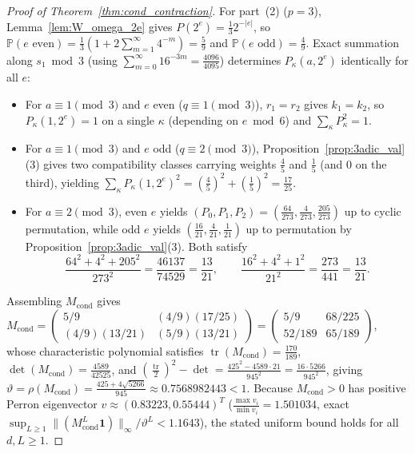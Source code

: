 \documentclass[11pt,a4paper]{article}
\numberwithin{equation}{section}
\theoremstyle{definition}
\theoremstyle{remark}
\renewcommand{\P}{\mathbb{P}}
\begin{document}
\begin{proof}[Proof of Theorem~\ref{thm:cond_contraction}]
For part~(2) ($p = 3$), Lemma~\ref{lem:W_omega_2e} gives $P(2^e) = \frac{1}{3} 2^{-|e|}$, so $\P(e \text{ even}) = \frac{1}{3}(1 + 2\sum_{m=1}^\infty 4^{-m}) = \frac{5}{9}$ and $\P(e \text{ odd}) = \frac{4}{9}$. Exact summation along $s_1 \bmod 3$ (using $\sum_{m=0}^\infty 16^{-3m} = \frac{4096}{4095}$) determines $P_\kappa(a, 2^e)$ identically for all $e$:
\begin{itemize}[leftmargin=2em]
\item For $a \equiv 1 \pmod 3$ and $e$ even ($q \equiv 1 \pmod 3$), $r_1 = r_2$ gives $k_1 = k_2$, so $P_\kappa(1, 2^e) = 1$ on a single $\kappa$ (depending on $e \bmod 6$) and $\sum_\kappa P_\kappa^2 = 1$.
\item For $a \equiv 1 \pmod 3$ and $e$ odd ($q \equiv 2 \pmod 3$), Proposition~\ref{prop:3adic_val}(3) gives two compatibility classes carrying weights $\frac{4}{5}$ and $\frac{1}{5}$ (and $0$ on the third), yielding $\sum_\kappa P_\kappa(1, 2^e)^2 = \left(\frac{4}{5}\right)^2 + \left(\frac{1}{5}\right)^2 = \frac{17}{25}$.
\item For $a \equiv 2 \pmod 3$, even $e$ yields $(P_0, P_1, P_2) = (\frac{64}{273}, \frac{4}{273}, \frac{205}{273})$ up to cyclic permutation, while odd $e$ yields $(\frac{16}{21}, \frac{4}{21}, \frac{1}{21})$ up to permutation by Proposition~\ref{prop:3adic_val}(3). Both satisfy
\[
\frac{64^2 + 4^2 + 205^2}{273^2} = \frac{46137}{74529} = \frac{13}{21}, \qquad \frac{16^2 + 4^2 + 1^2}{21^2} = \frac{273}{441} = \frac{13}{21}.
\]
\end{itemize}
Assembling $M_{\mathrm{cond}}$ gives $M_{\mathrm{cond}} = \begin{pmatrix} 5/9 & (4/9)(17/25) \\ (4/9)(13/21) & (5/9)(13/21) \end{pmatrix} = \begin{pmatrix} 5/9 & 68/225 \\ 52/189 & 65/189 \end{pmatrix}$, whose characteristic polynomial satisfies $\operatorname{tr}(M_{\mathrm{cond}}) = \frac{170}{189}$, $\det(M_{\mathrm{cond}}) = \frac{4589}{42525}$, and $(\frac{\operatorname{tr}}{2})^2 - \det = \frac{425^2 - 4589\cdot 21}{945^2} = \frac{16\cdot 5266}{945^2}$, giving $\vartheta = \rho(M_{\mathrm{cond}}) = \frac{425 + 4\sqrt{5266}}{945} \approx 0.7568982443 < 1$. Because $M_{\mathrm{cond}} > 0$ has positive Perron eigenvector $v \approx (0.83223, 0.55444)^T$ ($\frac{\max v_i}{\min v_i} = 1.501034$, exact $\sup_{L \ge 1}\|(M_{\mathrm{cond}}^L \mathbf{1})\|_\infty/\vartheta^L < 1.1643$), the stated uniform bound holds for all $d, L \ge 1$.
\end{proof}
\end{document}
